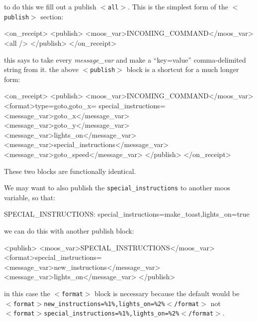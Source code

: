 \documentclass[11pt, letterpaper, oneside]{memoir}
\newcommand{\xmltag}[1]{\texttt{$<$#1$>$}}
\begin{document}
\begin{enumerate}
\begin{small}
\begin{boxedverbatim}
\end{boxedverbatim}
\resetbvlinenumber
\end{small}
to do this we fill out a publish \xmltag{all}. This is the simplest form of the \xmltag{publish} section:
\begin{small}
\begin{boxedverbatim}
    <on_receipt>
      <publish>
        <moos_var>INCOMING_COMMAND</moos_var>
        <all />
      </publish>
    </on_receipt>
\end{boxedverbatim}
\resetbvlinenumber
\end{small}
this says to take every \textit{message\_var} and make a ``key=value'' comma-delimited string from it. the above \xmltag{publish} block is a shortcut for a much longer form:
\begin{small}
\begin{boxedverbatim}
    <on_receipt>
      <publish>
        <moos_var>INCOMING_COMMAND</moos_var>
        <format>type=goto,goto_x=%
        special_instructions=%
        <message_var>goto_x</message_var>
        <message_var>goto_y</message_var>
        <message_var>lights_on</message_var>
        <message_var>special_instructions</message_var>
        <message_var>goto_speed</message_var>
      </publish>
    </on_receipt>
\end{boxedverbatim}
\resetbvlinenumber
\end{small}
These two blocks are functionally identical.

We may want to also publish the \verb|special_instructions| to another moos variable, so that:
\begin{small}
\begin{boxedverbatim}
SPECIAL_INSTRUCTIONS: special_instructions=make_toast,lights_on=true
\end{boxedverbatim}
\resetbvlinenumber
\end{small}
we can do this with another publish block:
\begin{small}
\begin{boxedverbatim}
    <publish>
      <moos_var>SPECIAL_INSTRUCTIONS</moos_var>
      <format>special_instructions=%
      <message_var>new_instructions</message_var>
      <message_var>lights_on</message_var>
    </publish>
\end{boxedverbatim}
\resetbvlinenumber
\end{small}
in this case the \xmltag{format} block is necessary because the default would be \\ 
\xmltag{format$>$new\_instructions=\%1\%,lights\_on=\%2\%$<$/format} not \\
\xmltag{format$>$special\_instructions=\%1\%,lights\_on=\%2\%$<$/format}.
\end{enumerate}
\end{document}
